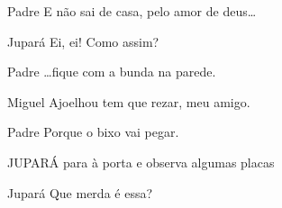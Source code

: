 \documentclass{screenplay}
\begin{document}
\begin{dialogue}{Padre}
    E não sai de casa, pelo amor de deus\dots
\end{dialogue}

\begin{dialogue}{Jupará}
    Ei, ei! Como assim?
\end{dialogue}

\begin{dialogue}{Padre}
    \dots fique com a bunda na parede.
\end{dialogue}

\begin{dialogue}{Miguel}
    Ajoelhou tem que rezar, meu amigo.
\end{dialogue}

\begin{dialogue}{Padre}
    Porque o bixo vai pegar.
\end{dialogue}

JUPARÁ para à porta e observa algumas placas

\begin{dialogue}{Jupará}
    Que merda é essa?
\end{dialogue}


\fadeout
\theend
\end{document}
